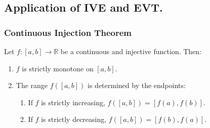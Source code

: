 \documentclass[
	UTF-8,
	11pt, %
	a4paper, %
]{LegrandOrangeBook}
\begin{document}




    \newpage

    \subsection{Application of IVE and EVT.}
    \subsubsection{Continuous Injection Theorem}

    \begin{theorem}
    Let $f: [a, b] \to \mathbb{R}$ be a continuous and injective function. Then:
    \begin{enumerate}
        \item $f$ is strictly monotone on $[a, b]$.
        \item The range $f([a, b])$ is determined by the endpoints:
        \begin{enumerate}
            \item If $f$ is strictly increasing, $f([a, b]) = [f(a), f(b)]$.
            \item If $f$ is strictly decreasing, $f([a, b]) = [f(b), f(a)]$.
        \end{enumerate}
    \end{enumerate}
    \end{theorem}
\end{document}
